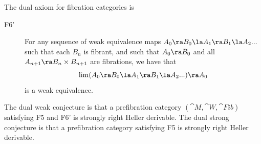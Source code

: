 The dual axiom for fibration categories is 

\begin{description}
\item[F6']
For any sequence of weak equivalence maps $A_0 \ra B_0 \la A_1 \ra B_1 \la A_2 ...$ such that each $B_n$ is fibrant, and such that $A_0 \ra B_0$ and all $A_{n+1} \ra B_n \times B_{n+1}$ are fibrations, we have that 
\[
\lim (A_0 \ra B_0 \la A_1 \ra B_1 \la A_2 ...) \ra A_0
\]
is a weak equivalence.
\end{description}

The dual weak conjecture is that a prefibration category $({\cat M}, {\cat W}, {\cat Fib})$ satisfying F5 and F6' is strongly right Heller derivable. The dual strong conjecture is that a prefibration category satisfying F5 is strongly right Heller derivable.
